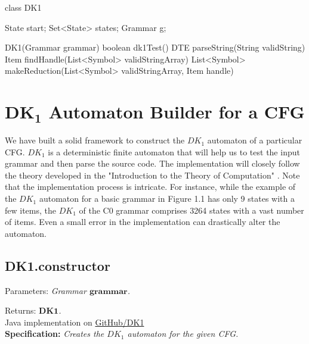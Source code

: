 \begin{codeblock}
    class DK1 {
        State start;
        Set<State> states;
        Grammar g;

        DK1(Grammar grammar) {}
        boolean dk1Test() {}
        DTE parseString(String validString) {}
        Item findHandle(List<Symbol> validStringArray) {}
        List<Symbol> makeReduction(List<Symbol> validStringArray, Item handle) {}
    }
\end{codeblock}

\newpage


\section{\(\boldsymbol{DK_{1}}\) Automaton Builder for a CFG}\label{sec:DK1 Automaton Builder for a CFG}

We have built a solid framework to construct the \(DK_{1}\) automaton of a particular CFG. \(DK_{1}\) is a deterministic finite automaton that will help us to test the input grammar and then parse the source code. The implementation will closely follow the theory developed in the "Introduction to the Theory of Computation" \cite{sipser}. Note that the implementation process is intricate. For instance, while the example of the \(DK_{1}\) automaton for a basic grammar in Figure 1.1 has only 9 states with a few items, the \(DK_{1}\) of the C0 grammar comprises 3264 states with a vast number of items. Even a small error in the implementation can drastically alter the automaton.

\vspace{10pt}

\subsection{DK1.constructor}

Parameters: \textit{Grammar \(\boldsymbol{grammar}\).}

Returns: \textit{\(\boldsymbol{DK1}\).}\\

Java implementation on \href{https://github.com/fyfsb/dcfg/blob/main/src/main/java/dk/DK1.java}{GitHub/DK1}\\

\textbf{Specification:} \textit{Creates the \(DK_{1}\) automaton for the given CFG.}\\

